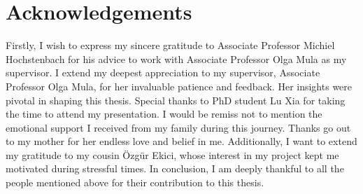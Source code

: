 \section{Acknowledgements}
Firstly, I wish to express my sincere gratitude to Associate Professor Michiel Hochstenbach for his advice to work with Associate Professor Olga Mula as my supervisor. I extend my deepest appreciation to my supervisor, Associate Professor Olga Mula, for her invaluable patience and feedback. Her insights were pivotal in shaping this thesis. Special thanks to PhD student Lu Xia for taking the time to attend my presentation. I would be remiss not to mention the emotional support I received from my family during this journey. Thanks go out to my mother for her endless love and belief in me. Additionally, I want to extend my gratitude to my cousin Özgür Ekici, whose interest in my project kept me motivated during stressful times. In conclusion, I am deeply thankful to all the people mentioned above for their contribution to this thesis.


















